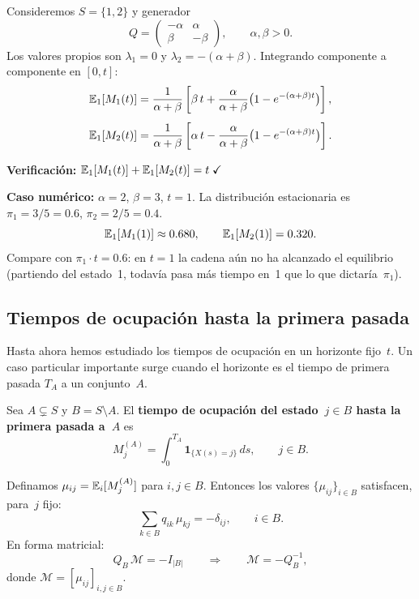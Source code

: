 \documentclass[11pt, letterpaper]{article}
\begin{document}
\begin{ejemplobox}
  Consideremos $S=\{1,2\}$ y generador
  \[
    Q = \begin{pmatrix} -\alpha & \alpha \\ \beta & -\beta \end{pmatrix},
    \qquad \alpha,\beta>0.
  \]
  Los valores propios son $\lambda_1=0$ y $\lambda_2=-(\alpha+\beta)$.
  Integrando componente a componente en $[0,t]$:
  \begin{align*}
    \mathbb{E}_1[M_1(t)] &= \frac{1}{\alpha+\beta}\left[\beta\,t
    + \frac{\alpha}{\alpha+\beta}\bigl(1-e^{-(\alpha+\beta)t}\bigr)\right],\\[4pt]
    \mathbb{E}_1[M_2(t)] &= \frac{1}{\alpha+\beta}\left[\alpha\,t
    - \frac{\alpha}{\alpha+\beta}\bigl(1-e^{-(\alpha+\beta)t}\bigr)\right].
  \end{align*}

  \textbf{Verificación:} $\mathbb{E}_1[M_1(t)]+\mathbb{E}_1[M_2(t)] = t\;\checkmark$

  \medskip
  \textbf{Caso numérico:} $\alpha=2$, $\beta=3$, $t=1$.
  La distribución estacionaria es $\pi_1=3/5=0.6$,
  $\pi_2=2/5=0.4$.
  \[
    \mathbb{E}_1[M_1(1)] \approx 0.680, \qquad \mathbb{E}_1[M_2(1)] = 0.320.
  \]
  Compare con $\pi_1\cdot t = 0.6$: en $t=1$ la cadena aún no
  ha alcanzado el equilibrio (partiendo del estado~1, todavía pasa
  más tiempo en~1 que lo que dictaría~$\pi_1$).
\end{ejemplobox}

\subsection{Tiempos de ocupación hasta la primera pasada}

Hasta ahora hemos estudiado los tiempos de ocupación en un horizonte
fijo~$t$.  Un caso particular importante surge cuando el horizonte es
el tiempo de primera pasada $T_A$ a un conjunto~$A$.

\begin{definicionbox}
  Sea $A\subsetneq S$ y $B=S\setminus A$.  El \textbf{tiempo de
  ocupación del estado~$j\in B$ hasta la primera pasada a~$A$} es
  \[
    M_j^{(A)} = \int_0^{T_A} \mathbf{1}_{\{X(s)=j\}}\,ds,
    \qquad j\in B.
  \]
\end{definicionbox}

\begin{metodobox}
  Definamos $\mu_{ij} = \mathbb{E}_i[M_j^{(A)}]$ para $i,j\in B$.  Entonces
  los valores $\{\mu_{ij}\}_{i\in B}$ satisfacen, para~$j$ fijo:
  \begin{equation}\label{eq:occ_fp}
    \sum_{k\in B} q_{ik}\,\mu_{kj} = -\delta_{ij},
    \qquad i\in B.
  \end{equation}
  En forma matricial:
  \begin{equation}\label{eq:occ_fp_mat}
    Q_B\,\mathcal{M} = -I_{|B|}
    \qquad\Longrightarrow\qquad
    \mathcal{M} = -Q_B^{-1},
  \end{equation}
  donde $\mathcal{M}=[\mu_{ij}]_{i,j\in B}$.
\end{metodobox}
\end{document}
